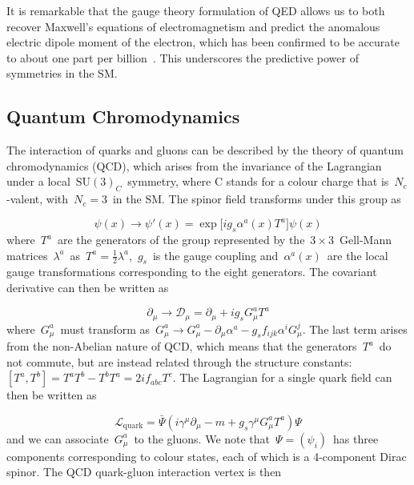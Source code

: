 It is remarkable that the gauge theory formulation of QED allows us to both recover Maxwell's equations of electromagnetism and predict the anomalous electric dipole moment of the electron, which has been confirmed to be accurate to about one part per billion~\cite{Aoyama:2007mn}. This underscores the predictive power of symmetries in the SM.

\subsection{Quantum Chromodynamics}
\label{sec:theory_qcd}
The interaction of quarks and gluons can be described by the theory of quantum chromodynamics (QCD), which arises from the invariance of the Lagrangian under a local~$\mathrm{SU}(3)_C$~symmetry, where C stands for a colour charge that is~$N_c$-valent, with~$N_c = 3$~in the SM. The spinor field transforms under this group as

\begin{equation}
\psi(x) \rightarrow \psi'(x) = \exp \bigl[ i g_s \alpha^a(x) T^a \bigr] \psi(x)
\end{equation}
where~$T^a$~are the generators of the group represented by the~$3\times3$~Gell-Mann matrices~$\lambda^a$~as~$T^a = \frac{1}{2} \lambda^a$,~$g_s$~is the gauge coupling and~$\alpha^a(x)$~are the local gauge transformations corresponding to the eight generators. The covariant derivative can then be written as


\begin{equation}
\label{eq:theory_qcd_deriv}
\partial_\mu \rightarrow \mathcal{D}_\mu = \partial_\mu + i g_s G^a_\mu T^a
\end{equation}
where~$G^a_\mu$~must transform as~$G^a_\mu \rightarrow G^a_\mu - \partial_\mu \alpha^a - g_s f_{ijk} \alpha^i G^j_\mu$. The last term arises from the non-Abelian nature of QCD, which means that the generators~$T^a$~do not commute, but are instead related through the structure constants:~$[T^a, T^b] = T^a T^b - T^b T^a = 2 i f_{abc} T^c$. The Lagrangian for a single quark field can then be written as

\begin{equation}
\label{eq:theory_quark_lagrangian}
\mathcal{L}_{\mathrm{quark}} = \bar{\Psi} (i \gamma^\mu \partial_\mu - m + g_s \gamma^\mu G^a_\mu T^a) \Psi
\end{equation}
and we can associate~$G^a_\mu$~to the gluons. We note that~$\Psi = (\psi_i)$~has three components corresponding to colour states, each of which is a 4-component Dirac spinor. The QCD quark-gluon interaction vertex is then

